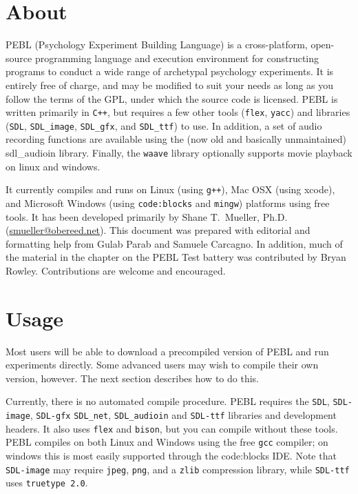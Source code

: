 \chapter{About}

PEBL (Psychology Experiment Building Language) is a cross-platform,
open-source programming language and execution environment for
constructing programs to conduct a wide range of archetypal psychology
experiments. It is entirely free of charge, and may be modified to
suit your needs as long as you follow the terms of the GPL, under
which the source code is licensed. PEBL is written primarily in
\texttt{C++}, but requires a few other tools (\texttt{flex},
\texttt{yacc}) and libraries (\texttt{SDL}, \texttt{SDL\_image},
\texttt{SDL\_gfx}, and \texttt{SDL\_ttf}) to use.  In addition, a set
of audio recording functions are available using the (now old and
basically unmaintained) sdl\_audioin library.  Finally, the
\texttt{waave} library optionally supports movie playback on linux and
windows.


It currently compiles and runs on Linux (using \texttt{g++}), Mac OSX
(using xcode), and Microsoft Windows (using \texttt{code:blocks} and
\texttt{mingw}) platforms using free tools. It has been developed
primarily by Shane T.~Mueller,
Ph.D. (\href{mailto:smueller@obereed.net}{smueller@obereed.net}). This
document was prepared with editorial and formatting help from Gulab
Parab and Samuele Carcagno. In addition, much of the material in the chapter on the PEBL Test battery was contributed by Bryan Rowley. Contributions are welcome and encouraged.

\chapter{Usage}
Most users will be able to download a precompiled version of PEBL and
run experiments directly. Some advanced users may wish to compile
their own version, however.  The next section describes how to do this.


Currently, there is no automated compile procedure.  PEBL requires the
\texttt{SDL}, \texttt{SDL-image}, \texttt{SDL-gfx} \texttt{SDL\_net},
 \texttt{SDL\_audioin} and
\texttt{SDL-ttf} libraries and development headers.  It also uses
\texttt{flex} and \texttt{bison}, but you can compile without these
tools. PEBL compiles on both Linux and Windows using the free
\texttt{gcc} compiler; on windows this is most easily supported through the code:blocks IDE. Note that \texttt{SDL-image} may require
\texttt{jpeg}, \texttt{png}, and a \texttt{zlib} compression library,
while \texttt{SDL-ttf} uses \texttt{truetype 2.0}.

